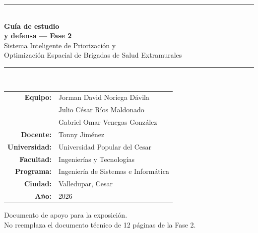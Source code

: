 \documentclass[11pt,a4paper]{article}
\newcommand{\code}[1]{\texttt{#1}}
\begin{document}
\hypersetup{pageanchor=false}
\begin{titlepage}
\centering
\vspace*{1.2cm}

{\color{azul}\rule{\textwidth}{3pt}}\\[0.45cm]
{\Huge\bfseries\color{azul} Guía de estudio\\[0.15cm] y defensa — Fase 2}\\[0.55cm]
{\Large Sistema Inteligente de Priorización y\\[0.1cm]
Optimización Espacial de Brigadas de Salud Extramurales}\\[0.35cm]
{\color{azul}\rule{\textwidth}{1pt}}\\[1.0cm]

\begin{tabular}{r l}
\textbf{Equipo:} & Jorman David Noriega Dávila \\
 & Julio César Ríos Maldonado \\
 & Gabriel Omar Venegas González \\[0.35cm]
\textbf{Docente:} & Tonny Jiménez \\
\textbf{Universidad:} & Universidad Popular del Cesar \\
\textbf{Facultad:} & Ingenierías y Tecnologías \\
\textbf{Programa:} & Ingeniería de Sistemas e Informática \\
\textbf{Ciudad:} & Valledupar, Cesar \\
\textbf{Año:} & 2026 \\
\end{tabular}

\vfill

\begin{tcolorbox}[colback=azul!5,colframe=azul,width=0.88\textwidth]
\centering
\small
Documento de apoyo para la exposición.\\
No reemplaza el documento técnico de 12 páginas de la Fase 2.
\end{tcolorbox}

\vspace{0.6cm}
\end{titlepage}
\hypersetup{pageanchor=true}

\begin{abstract}
\noindent
Esta guía reúne, en un solo documento, la explicación del dataset que dejó la Fase~1, el procesamiento y los resultados de la Fase~2, y un plan de estudio para explicar el proyecto paso a paso. Está organizada en tres bloques: \textbf{(1)} qué contiene la tabla \code{municipio_anio.parquet}, cuáles son sus 27 entradas y cuál es su salida; \textbf{(2)} qué hacen los modelos y el MILP con esa información; y \textbf{(3)} cómo estudiar y exponer el proyecto, con guion de seis minutos, banco de preguntas y errores que conviene evitar.
\end{abstract}
\end{document}
